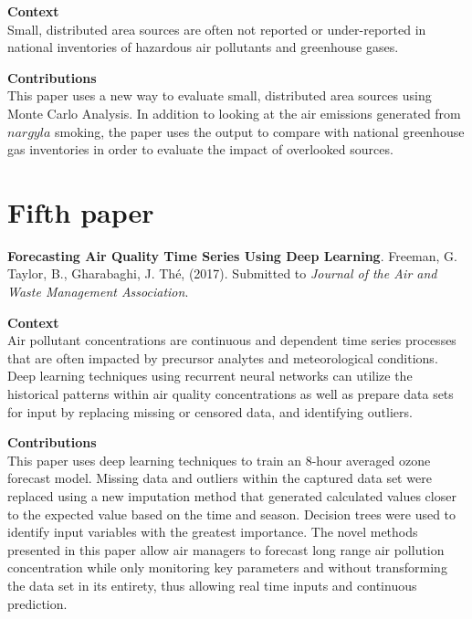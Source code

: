 \vspace{5mm}
\noindent
\textbf{Context}\\
\noindent
Small, distributed area sources are often not reported or under-reported in national inventories of hazardous air pollutants and greenhouse gases. 

\vspace{5mm}
\noindent
\textbf{Contributions}\\
\noindent
This paper uses a new way to evaluate small, distributed area sources using Monte Carlo Analysis. In addition to looking at the air emissions generated from $nargyla$ smoking, the paper uses the output to compare with national greenhouse gas inventories in order to evaluate the impact of overlooked sources.

\section{Fifth paper}

\textbf{Forecasting Air Quality Time Series Using Deep Learning}. Freeman, G. Taylor, B., Gharabaghi, J.  Th\'e, (2017). Submitted to \textit{Journal of the Air and Waste Management Association}.

\vspace{5mm}
\noindent
\textbf{Context}\\
\noindent
Air pollutant concentrations are continuous and dependent time series processes that are often impacted by precursor analytes and meteorological conditions. Deep learning techniques using recurrent neural networks can utilize the historical patterns within air quality concentrations as well as prepare data sets for input by replacing missing or censored data, and identifying outliers.

\vspace{5mm}
\noindent
\textbf{Contributions}\\
\noindent
This paper uses deep learning techniques to train an 8-hour averaged ozone forecast model. Missing data and outliers within the captured data set were replaced using a new imputation method that generated calculated values closer to the expected value based on the time and season. Decision trees were used to identify input variables with the greatest importance. The novel methods presented in this paper allow air managers to forecast long range air pollution concentration while only monitoring key parameters and without transforming the data set in its entirety, thus allowing real time inputs and continuous prediction.

\clearpage
